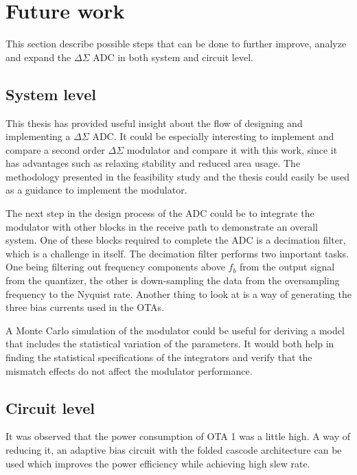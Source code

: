 \section{Future work}
This section describe possible steps that can be done to further improve, analyze and expand the $\Delta\Sigma$ ADC in both system and circuit level. 

\subsection{System level}
This thesis has provided useful insight about the flow of designing and implementing a $\Delta\Sigma$ ADC. It could be especially interesting to implement and compare a second order $\Delta\Sigma$ modulator and compare it with this work, since it has advantages such as relaxing stability and reduced area usage. The methodology presented in the feasibility study and the thesis could easily be used as a guidance to implement the modulator. 

The next step in the design process of the ADC could be to integrate the modulator with other blocks in the receive path to demonstrate an overall system. One of these blocks required to complete the ADC is a decimation filter, which is a challenge in itself. The decimation filter performs two important tasks. One being filtering out frequency components above $f_b$ from the output signal from the quantizer, the other is down-sampling the data from the oversampling frequency to the Nyquist rate. Another thing to look at is a way of generating the three bias currents used in the OTAs. 

A Monte Carlo simulation of the modulator could be useful for deriving a model that includes the statistical variation of the parameters. It would both help in finding the statistical specifications of the integrators and verify that the mismatch effects do not affect the modulator performance. 

\subsection{Circuit level}

It was observed that the power consumption of OTA 1 was a little high. A way of reducing it, an adaptive bias circuit with the folded cascode architecture can be used which improves the power efficiency while achieving high slew rate. 
